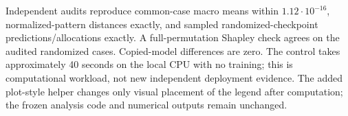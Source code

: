 Independent audits reproduce common-case macro means within $1.12\cdot10^{-16}$, normalized-pattern distances exactly, and sampled randomized-checkpoint predictions/allocations exactly. A full-permutation Shapley check agrees on the audited randomized cases. Copied-model differences are zero. The control takes approximately 40 seconds on the local CPU with no training; this is computational workload, not new independent deployment evidence. The added plot-style helper changes only visual placement of the legend after computation; the frozen analysis code and numerical outputs remain unchanged.
